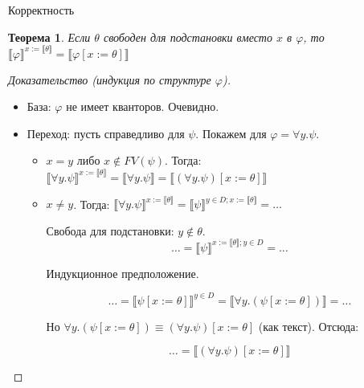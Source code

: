 \documentclass[aspectratio=169]{beamer}
\newtheorem{thm}{Теорема}[section]
\begin{document}
\begin{frame}{Корректность}
\begin{thm}Если $\theta$ свободен для подстановки 
вместо $x$ в $\varphi$, то $\llbracket\varphi\rrbracket^{x := \llbracket\theta\rrbracket} = \llbracket\varphi[x := \theta]\rrbracket$\end{thm}
\begin{proof}[Доказательство (индукция по структуре $\varphi$)]
\begin{itemize}
\item База: $\varphi$ не имеет кванторов. Очевидно.
\item Переход: пусть справедливо для $\psi$. Покажем для $\varphi = \forall y.\psi$. 
\begin{itemize}
\item $x=y$ либо $x \notin FV(\psi)$. Тогда: 
$\llbracket\forall y.\psi\rrbracket^{x := \llbracket\theta\rrbracket} = \llbracket\forall y.\psi\rrbracket = \llbracket(\forall y.\psi)[x := \theta]\rrbracket$

\item $x \ne y$. Тогда: $\llbracket\forall y.\psi\rrbracket^{x := \llbracket\theta\rrbracket} = 
  \llbracket\psi\rrbracket^{y \in D; x := \llbracket\theta\rrbracket} = \dots$

{\color{olive}Свобода для подстановки: $y\notin\theta$.}
\vspace{-0.3cm}
 $$\dots = \llbracket\psi\rrbracket^{x := \llbracket\theta\rrbracket; y \in D} = \dots$$
\vspace{-0.8cm}

{\color{olive}Индукционное предположение.}
\vspace{-0.3cm}

 $$\dots = \llbracket\psi[x := \theta]\rrbracket^{y \in D} = 
\llbracket\forall y.(\psi[x := \theta])\rrbracket = \dots$$
\vspace{-0.5cm}

{\color{olive}Но $\forall y.(\psi[x := \theta]) \equiv (\forall y.\psi) [x := \theta]$ (как текст). Отсюда:}
\vspace{-0.3cm}

$$\dots = \llbracket(\forall y.\psi)[ x := \theta]\rrbracket$$
\vspace{-0.5cm}
\end{itemize}
\end{itemize} \end{proof}
\end{frame}
\end{document}
